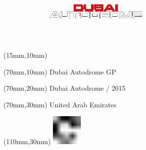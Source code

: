 \null\newpage
\begin{textblock*}{50mm}(15mm,10mm)%
\includegraphics[width=50mm]{LG/DUB.png}
\end{textblock*}
\begin{textblock*}{130mm}(70mm,10mm)%
{\fontsize{20}{20}\selectfont Dubai Autodrome GP}\\
\end{textblock*}
\begin{textblock*}{120mm}(70mm,20mm)%
{\fontsize{16}{16}\selectfont Dubai Autodrome / 2015}\\
\end{textblock*}
\begin{textblock*}{120mm}(70mm,30mm)%
{\fontsize{12}{12}\selectfont United Arab Emirates}
\end{textblock*}
\begin{textblock*}{30mm}(110mm,30mm)%
\centering
\includegraphics[height=15mm]{icons/fa-rotate-right.pdf}
\end{textblock*}
